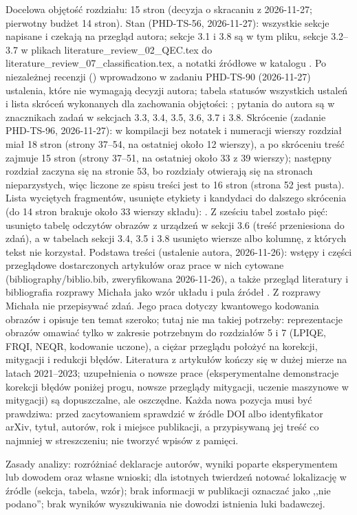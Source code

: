 {Docelowa objętość rozdziału: 15 stron (decyzja o skracaniu z 2026-11-27; pierwotny budżet 14 stron).
Stan (PHD-TS-56, 2026-11-27): wszystkie sekcje napisane i czekają na przegląd autora; sekcje 3.1 i 3.8 są w tym pliku, sekcje 3.2--3.7 w plikach literature_review_02_QEC.tex do literature_review_07_classification.tex, a notatki źródłowe w katalogu .
Po niezależnej recenzji () wprowadzono w zadaniu PHD-TS-90 (2026-11-27) ustalenia, które nie wymagają decyzji autora; tabela statusów wszystkich ustaleń i lista skróceń wykonanych dla zachowania objętości: ; pytania do autora są w znacznikach zadań w sekcjach 3.3, 3.4, 3.5, 3.6, 3.7 i 3.8.
Skrócenie (zadanie PHD-TS-96, 2026-11-27): w kompilacji bez notatek i numeracji wierszy rozdział miał 18 stron (strony 37--54, na ostatniej około 12 wierszy), a po skróceniu treść zajmuje 15 stron (strony 37--51, na ostatniej około 33 z 39 wierszy); następny rozdział zaczyna się na stronie 53, bo rozdziały otwierają się na stronach nieparzystych, więc liczone ze spisu treści jest to 16 stron (strona 52 jest pusta).
Lista wyciętych fragmentów, usunięte etykiety i kandydaci do dalszego skrócenia (do 14 stron brakuje około 33 wierszy składu): .
Z sześciu tabel zostało pięć: usunięto tabelę odczytów obrazów z urządzeń w sekcji 3.6 (treść przeniesiona do zdań), a w tabelach sekcji 3.4, 3.5 i 3.8 usunięto wiersze albo kolumnę, z których tekst nie korzystał.
Podstawa treści (ustalenie autora, 2026-11-26): wstępy i części przeglądowe dostarczonych artykułów oraz prace w nich cytowane (bibliography/biblio.bib, zweryfikowana 2026-11-26), a także przegląd literatury i bibliografia rozprawy Michała jako wzór układu i pula źródeł .
Z rozprawy Michała nie przepisywać zdań.
Jego praca dotyczy kwantowego kodowania obrazów i opisuje ten temat szeroko; tutaj nie ma takiej potrzeby: reprezentacje obrazów omawiać tylko w zakresie potrzebnym do rozdziałów 5 i 7 (LPIQE, FRQI, NEQR, kodowanie uczone), a ciężar przeglądu położyć na korekcji, mitygacji i redukcji błędów.
Literatura z artykułów kończy się w dużej mierze na latach 2021--2023; uzupełnienia o nowsze prace (eksperymentalne demonstracje korekcji błędów poniżej progu, nowsze przeglądy mitygacji, uczenie maszynowe w mitygacji) są dopuszczalne, ale oszczędne.
Każda nowa pozycja musi być prawdziwa: przed zacytowaniem sprawdzić w źródle DOI albo identyfikator arXiv, tytuł, autorów, rok i miejsce publikacji, a przypisywaną jej treść co najmniej w streszczeniu; nie tworzyć wpisów z pamięci.

Zasady analizy:
rozróżniać deklaracje autorów, wyniki poparte eksperymentem lub dowodem oraz własne wnioski;
dla istotnych twierdzeń notować lokalizację w źródle (sekcja, tabela, wzór);
brak informacji w publikacji oznaczać jako ,,nie podano'';
brak wyników wyszukiwania nie dowodzi istnienia luki badawczej.
}

